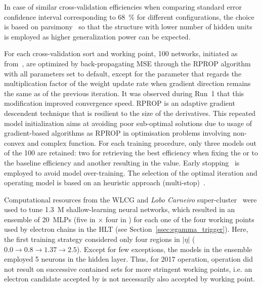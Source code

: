 In case of similar cross-validation efficiencies when comparing standard
error confidence interval corresponding to \SI{68}{\%} for different
configurations, the choice is based on
parsimony~\cite{haykin_2008, medeiros2001statistical} so that the structure with lower number of hidden units
is employed as higher generalization power can be expected. 






For each cross-validation sort and working point, 100 networks, initiated
as from~\cite{initnw}, are optimized by back-propagating MSE through the RPROP
algorithm~\cite{rprop} with all parameters set to default,
except for the parameter that regards the multiplication factor of the weight update rate when gradient direction remains the same as of the previous iteration. It was 
observed during Run~1 that this modification improved convergence speed. RPROP
is an adaptive gradient descendent technique that is resilient to the size of
the derivatives. This repeated model initialization aims at
avoiding poor sub-optimal solutions due to usage of gradient-based algorithms as
RPROP in optimisation problems involving non-convex and complex function.
For each training procedure, only three models out of the 100 are retained: two
for retrieving the best efficiency when fixing the \pd{} or \pf{} to the
baseline \fastcalo{} efficiency and another resulting in the \spmax{} value.
Early stopping~\cite{haykin_2008} is employed to avoid model over-training. The
selection of the optimal iteration and operating model is based on an heuristic approach (multi-stop)~\cite{Goodfellow2016}.


Computational resources from the WLCG and \emph{Lobo Carneiro}
super-cluster~\cite{lobo_carneiro} were used to tune 1.3~M shallow-learning
neural networks, which resulted in an ensemble of \SI{20}{MLPs} (five in \et{}
$\times$ four in \abseta{}) for each one of the four working points used by
electron chains in the HLT (see Section~\ref{ssec:egamma_trigger}).
Here, the first training strategy considered only four regions in $|\eta|$ ($0.0\rightarrow 0.8\rightarrow1.37\rightarrow2.5$).
Except for few exceptions, the models in the ensemble employed 5 neurons in the 
hidden layer.  Thus, for 2017 operation, 
\rnn{} operation did not result on
successive contained sets for more stringent working points, i.e. an electron
candidate accepted by \medium{} is not necessarily also accepted by \loose{}
working point. %


